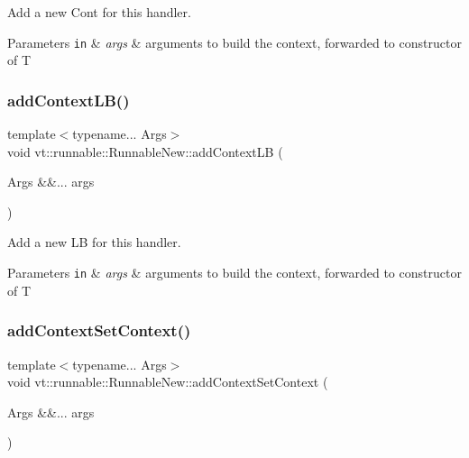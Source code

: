 Add a new {\ttfamily Cont} for this handler. 


\begin{DoxyParams}[1]{Parameters}
\mbox{\tt in}  & {\em args} & arguments to build the context, forwarded to constructor of {\ttfamily T} \\
\hline
\end{DoxyParams}
\mbox{\label{structvt_1_1runnable_1_1_runnable_new_a9c4377c29d2c8f1e3b85488038f31bdf}} 
\subsubsection{\texorpdfstring{add\+Context\+L\+B()}{addContextLB()}}
{\footnotesize\ttfamily template$<$typename... Args$>$ \\
void vt\+::runnable\+::\+Runnable\+New\+::add\+Context\+LB (\begin{DoxyParamCaption}\item[{Args \&\&...}]{args }\end{DoxyParamCaption})}



Add a new {\ttfamily LB} for this handler. 


\begin{DoxyParams}[1]{Parameters}
\mbox{\tt in}  & {\em args} & arguments to build the context, forwarded to constructor of {\ttfamily T} \\
\hline
\end{DoxyParams}
\mbox{\label{structvt_1_1runnable_1_1_runnable_new_a37c77d1949cd1590b74d286814bed1ef}} 
\subsubsection{\texorpdfstring{add\+Context\+Set\+Context()}{addContextSetContext()}}
{\footnotesize\ttfamily template$<$typename... Args$>$ \\
void vt\+::runnable\+::\+Runnable\+New\+::add\+Context\+Set\+Context (\begin{DoxyParamCaption}\item[{Args \&\&...}]{args }\end{DoxyParamCaption})}



